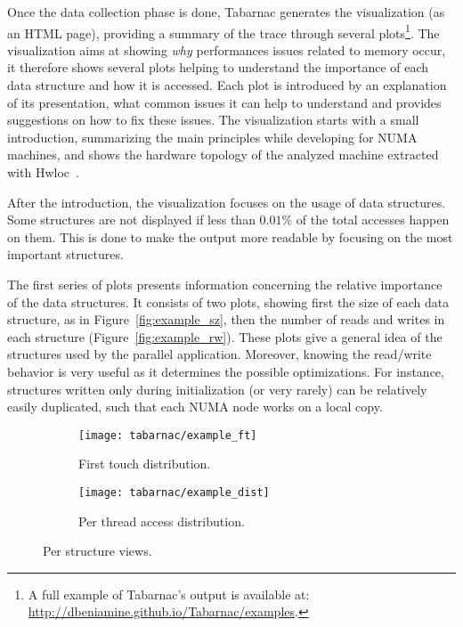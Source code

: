 Once the data collection phase is done,
\gls{Tabarnac} generates the visualization (as an HTML page), providing a summary
of the trace through several plots\footnote{A full example of \gls{Tabarnac}'s output is available at:\\\small
    \url{http://dbeniamine.github.io/Tabarnac/examples}.}.
The visualization aims at showing \emph{why} performances issues related
to memory occur, it therefore shows several plots helping to understand the
importance of each data structure and how it is accessed.
Each plot is introduced by an explanation
of its presentation, what common issues it can help to understand and provides
suggestions on how to fix these issues.  The visualization starts with a small
introduction, summarizing the main principles while developing for NUMA
machines, and shows the hardware topology of the analyzed machine extracted
with Hwloc~\cite{Broquedis10hwloc}.


After the introduction, the visualization focuses on the usage of data structures. Some
structures are not displayed if less than $0.01\%$ of the total accesses happen on them. This is
done to make the output more readable by focusing on the most important structures.

The first series of plots presents information concerning the relative
importance of the data structures. It consists of two plots, showing first the
size of each data structure, as in Figure~\ref{fig:example_sz}, then the
number of reads and writes in each structure (Figure~\ref{fig:example_rw}). These plots give a
general idea of the structures used by the parallel application.
Moreover, knowing the read/write behavior is very
useful as it determines the possible optimizations. For instance, structures
written only during initialization (or very rarely) can be relatively easily
duplicated, such that each NUMA node works on a local copy.

\begin{figure}[htb]
    \centering
    \begin{subfigure}{.49\linewidth}
        \texttt{[image: tabarnac/example\_ft]}
        \caption{First touch distribution.}
        \label{fig:example_ft}
    \end{subfigure}
    \begin{subfigure}{.49\linewidth}
        \texttt{[image: tabarnac/example\_dist]}
        \caption{Per thread access distribution.}
        \label{fig:example_dist}
    \end{subfigure}
    \caption{Per structure views.}
    \label{fig:example_by_structs}
\end{figure}


